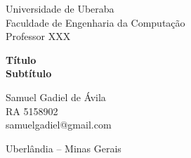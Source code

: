 \documentclass [12pt]{article}
\begin{document}
\sloppy
\begin{titlepage}
  \huge
  \begin{center}
    Universidade de Uberaba\\
    \Large
    Faculdade de Engenharia da Computação \\
    Professor XXX\\
    \vspace{5cm}

    \textbf{Título}\\
    \textbf{Subtítulo}

  \end{center}
  \vspace{3cm} \normalsize
  \begin{flushright}
    Samuel Gadiel de Ávila\\
    RA 5158902\\
    samuelgadiel@gmail.com\\
  \end{flushright}
  \vfill
  \begin{center}
    Uberlândia – Minas Gerais\\
    \the\year
  \end{center}
\end{titlepage}



\clearpage
\end{document}
